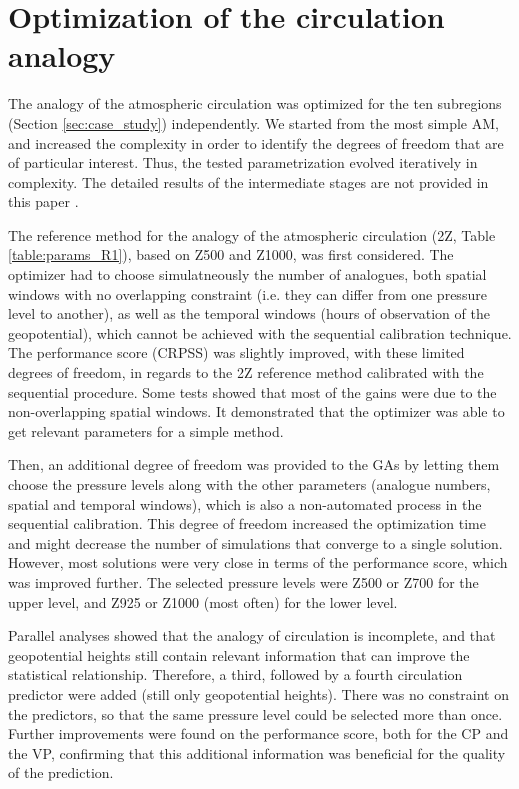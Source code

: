 \documentclass[review]{elsarticle}
\begin{document}
\section{Optimization of the circulation analogy}
\label{sec:optim_circul}

The analogy of the atmospheric circulation was optimized for the ten subregions (Section \ref{sec:case_study})  independently. We started from the most simple AM, and increased the complexity in order to identify the degrees of freedom that are of particular interest. Thus, the tested parametrization evolved iteratively in complexity. The detailed results of the intermediate stages are not provided in this paper \citep[see][for the details]{Horton2012a}.

The reference method for the analogy of the atmospheric circulation (2Z, Table \ref{table:params_R1}), based on Z500 and Z1000, was first considered. The optimizer had to choose simulatneously the number of analogues, both spatial windows with no overlapping constraint (i.e. they can differ from one pressure level to another), as well as the temporal windows (hours of observation of the geopotential), which cannot be achieved with the sequential calibration technique. The performance score (CRPSS) was slightly improved, with these limited degrees of freedom, in regards to the 2Z reference method calibrated with the sequential procedure. Some tests showed that most of the gains were due to the non-overlapping spatial windows. It demonstrated that the optimizer was able to get relevant parameters for a simple method.

Then, an additional degree of freedom was provided to the GAs by letting them choose the pressure levels along with the other parameters (analogue numbers, spatial and temporal windows), which is also a non-automated process in the sequential calibration. This degree of freedom increased the optimization time and might decrease the number of simulations that converge to a single solution. However, most solutions were very close in terms of the performance score, which was improved further. The selected pressure levels were Z500 or Z700 for the upper level, and Z925 or Z1000 (most often) for the lower level.

Parallel analyses showed that the analogy of circulation is incomplete, and that geopotential heights still contain relevant information that can improve the statistical relationship. Therefore, a third, followed by a fourth circulation predictor were added (still only geopotential heights). There was no constraint on the predictors, so that the same pressure level could be selected more than once. Further improvements were found on the performance score, both for the CP and the VP, confirming that this additional information was beneficial for the quality of the prediction. 
\end{document}

